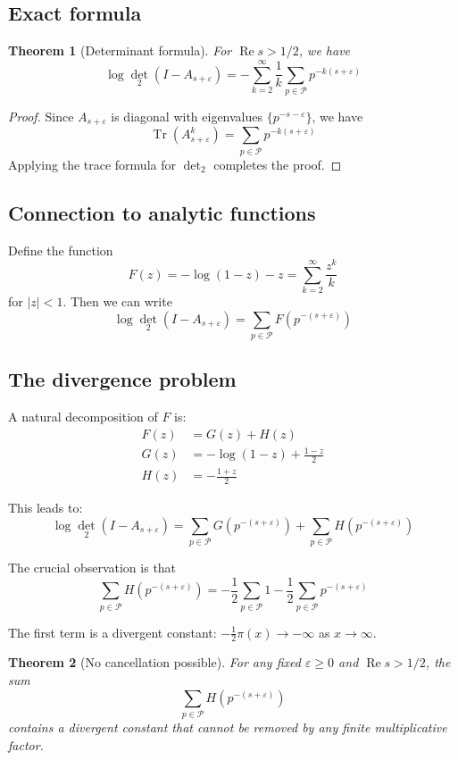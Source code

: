 \documentclass[11pt,a4paper]{article}
\newtheorem{theorem}{Theorem}[section]
\theoremstyle{definition}
\theoremstyle{remark}
\newcommand{\calP}{\mathcal{P}}
\DeclareMathOperator{\Tr}{Tr}
\DeclareMathOperator{\det}{det}
\DeclareMathOperator{\Re}{Re}
\begin{document}
\subsection{Exact formula}

\begin{theorem}[Determinant formula]\label{thm:det-formula}
For $\Re s > 1/2$, we have
\[
\log \det_2(I - A_{s+\varepsilon}) = -\sum_{k=2}^\infty \frac{1}{k} \sum_{p \in \calP} p^{-k(s+\varepsilon)}
\]
\end{theorem}

\begin{proof}
Since $A_{s+\varepsilon}$ is diagonal with eigenvalues $\{p^{-s-\varepsilon}\}$, we have
\[
\Tr(A_{s+\varepsilon}^k) = \sum_{p \in \calP} p^{-k(s+\varepsilon)}
\]
Applying the trace formula for $\det_2$ completes the proof.
\end{proof}

\subsection{Connection to analytic functions}

Define the function
\[
F(z) = -\log(1-z) - z = \sum_{k=2}^\infty \frac{z^k}{k}
\]
for $|z| < 1$. Then we can write
\[
\log \det_2(I - A_{s+\varepsilon}) = \sum_{p \in \calP} F(p^{-(s+\varepsilon)})
\]

\subsection{The divergence problem}

A natural decomposition of $F$ is:
\begin{align}
F(z) &= G(z) + H(z)\\
G(z) &= -\log(1-z) + \frac{1-z}{2}\\
H(z) &= -\frac{1+z}{2}
\end{align}

This leads to:
\[
\log \det_2(I - A_{s+\varepsilon}) = \sum_{p \in \calP} G(p^{-(s+\varepsilon)}) + \sum_{p \in \calP} H(p^{-(s+\varepsilon)})
\]

The crucial observation is that
\[
\sum_{p \in \calP} H(p^{-(s+\varepsilon)}) = -\frac{1}{2}\sum_{p \in \calP} 1 - \frac{1}{2}\sum_{p \in \calP} p^{-(s+\varepsilon)}
\]

The first term is a divergent constant: $-\frac{1}{2}\pi(x) \to -\infty$ as $x \to \infty$.

\begin{theorem}[No cancellation possible]\label{thm:no-cancel}
For any fixed $\varepsilon \geq 0$ and $\Re s > 1/2$, the sum
\[
\sum_{p \in \calP} H(p^{-(s+\varepsilon)})
\]
contains a divergent constant that cannot be removed by any finite multiplicative factor.
\end{theorem}
\end{document}
